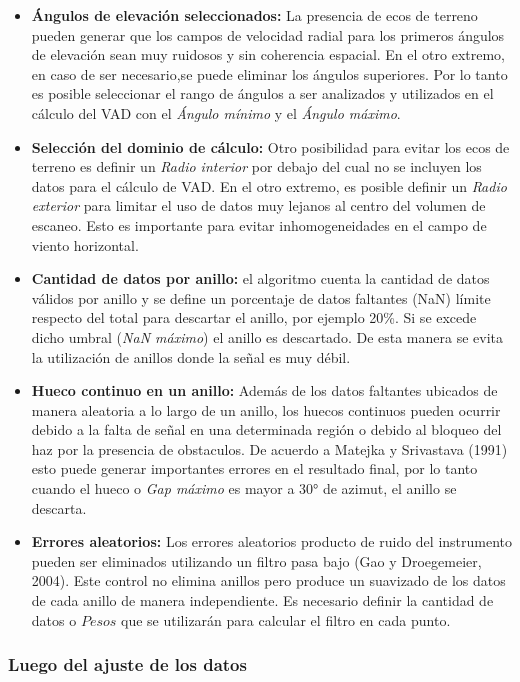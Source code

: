 \documentclass[12pt,spanish,oneside, a4paper]{book}
\providecommand{\tightlist}{%
  \setlength{\itemsep}{0pt}\setlength{\parskip}{0pt}}
\begin{document}
\begin{itemize}
\tightlist
\item
  \textbf{Ángulos de elevación seleccionados:} La presencia de ecos de
  terreno pueden generar que los campos de velocidad radial para los
  primeros ángulos de elevación sean muy ruidosos y sin coherencia
  espacial. En el otro extremo, en caso de ser necesario,se puede
  eliminar los ángulos superiores. Por lo tanto es posible seleccionar
  el rango de ángulos a ser analizados y utilizados en el cálculo del
  VAD con el \emph{Ángulo mínimo} y el \emph{Ángulo máximo}.
\item
  \textbf{Selección del dominio de cálculo:} Otro posibilidad para
  evitar los ecos de terreno es definir un \emph{Radio interior} por
  debajo del cual no se incluyen los datos para el cálculo de VAD. En el
  otro extremo, es posible definir un \emph{Radio exterior} para limitar
  el uso de datos muy lejanos al centro del volumen de escaneo. Esto es
  importante para evitar inhomogeneidades en el campo de viento
  horizontal.
\item
  \textbf{Cantidad de datos por anillo:} el algoritmo cuenta la cantidad
  de datos válidos por anillo y se define un porcentaje de datos
  faltantes (NaN) límite respecto del total para descartar el anillo,
  por ejemplo 20\%. Si se excede dicho umbral (\emph{NaN máximo}) el
  anillo es descartado. De esta manera se evita la utilización de
  anillos donde la señal es muy débil.
\item
  \textbf{Hueco continuo en un anillo:} Además de los datos faltantes
  ubicados de manera aleatoria a lo largo de un anillo, los huecos
  continuos pueden ocurrir debido a la falta de señal en una determinada
  región o debido al bloqueo del haz por la presencia de obstaculos. De
  acuerdo a Matejka y Srivastava (1991) esto puede generar importantes
  errores en el resultado final, por lo tanto cuando el hueco o
  \emph{Gap máximo} es mayor a 30° de azimut, el anillo se descarta.
\item
  \textbf{Errores aleatorios:} Los errores aleatorios producto de ruido
  del instrumento pueden ser eliminados utilizando un filtro pasa bajo
  (Gao y Droegemeier, 2004). Este control no elimina anillos pero
  produce un suavizado de los datos de cada anillo de manera
  independiente. Es necesario definir la cantidad de datos o \(Pesos\)
  que se utilizarán para calcular el filtro en cada punto.
\end{itemize}

\subsubsection{Luego del ajuste de los
datos}\label{luego-del-ajuste-de-los-datos}
\end{document}
